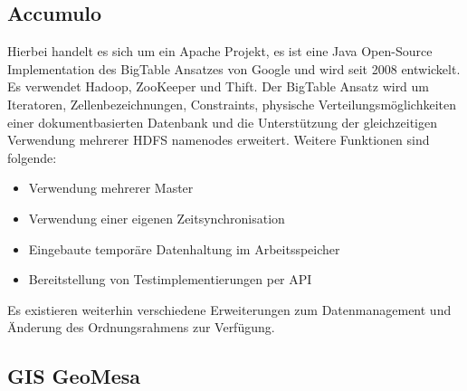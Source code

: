 \subsection{Accumulo}
\label{accumulo}
Hierbei handelt es sich um ein Apache Projekt, es ist eine Java Open-Source Implementation des BigTable Ansatzes von Google und wird seit 2008 entwickelt.
Es verwendet Hadoop, ZooKeeper und Thift.
Der BigTable Ansatz wird um Iteratoren, Zellenbezeichnungen, Constraints, physische Verteilungsmöglichkeiten einer dokumentbasierten Datenbank und die Unterstützung der gleichzeitigen Verwendung mehrerer HDFS namenodes erweitert.
Weitere Funktionen sind folgende:
\begin{itemize}
\item Verwendung mehrerer Master
\item Verwendung einer eigenen Zeitsynchronisation
\item Eingebaute temporäre Datenhaltung im Arbeitsspeicher
\item Bereitstellung von Testimplementierungen per API
\end {itemize}
Es existieren weiterhin verschiedene Erweiterungen zum Datenmanagement und Änderung des Ordnungsrahmens zur Verfügung. \cite{website:accumulo_features}

\subsection{GIS GeoMesa}

